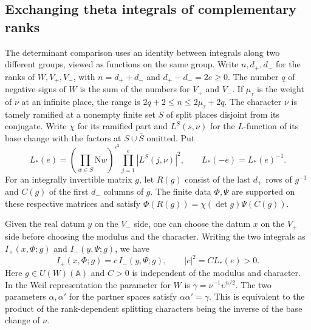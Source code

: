 \subsection{Exchanging theta integrals of complementary ranks}\label{sec:exchange-proof}

The determinant comparison uses an identity between integrals along two different
groups, viewed as functions on the same group. Write \(n,d_+,d_-\) for the ranks of
\(W,V_+,V_-\), with \(n=d_++d_-\) and \(d_+-d_-=2e\ge0\).
The number \(q\) of negative signs of \(W\) is the sum of the numbers for \(V_+\)
and \(V_-\). If \(\mu_\tau\) is the weight of \(\nu\) at an infinite place,
the range is \(2q+2\le n\le2\mu_\tau+2q\).
The character \(\nu\) is tamely ramified at a nonempty finite set \(S\) of split
places disjoint from its conjugate. Write \(\chi\) for its ramified part and
\(L^S(s,\nu)\) for the \(L\)-function of its base change with the factors
at \(S\cup\bar S\) omitted. Put
\begin{equation}\label{eq:exchange-lstar}
 L_*(e)=\left(\prod_{w\in S}\mathrm Nw\right)^{e^2}
             \prod_{j=1}^{e}|L^S(j,\nu)|^2,\qquad
 L_*(-e)=L_*(e)^{-1}.
\end{equation}
For an integrally invertible matrix \(g\), let \(R(g)\) consist of the last
\(d_+\) rows of \(g^{-1}\) and \(C(g)\) of the first \(d_-\) columns of \(g\).
The finite data \(\Phi,\Psi\) are supported on these respective matrices
and satisfy \(\Phi(R(g))=\chi(\det g)\Psi(C(g))\).

Given the real datum \(y\) on the \(V_-\) side, one can choose the datum \(x\)
on the \(V_+\) side before choosing the modulus and the character.
Writing the two integrals as \(I_+(x,\Phi;g)\) and \(I_-(y,\Psi;g)\), we have
\begin{equation}\label{eq:exchanged-integrals}
 I_+(x,\Phi;g)=c\,I_-(y,\Psi;g),\qquad
 |c|^2=C L_*(e)>0.
\end{equation}
Here \(g\in U(W)(\mathbb A)\) and \(C>0\) is independent of the modulus and character.
In the Weil representation the parameter for \(W\) is \(\gamma=\nu^{-1}\upsilon^{n/2}\).
The two parameters \(\alpha,\alpha'\) for the partner spaces satisfy
\(\alpha\alpha'=\gamma\). This is equivalent to the product of the
rank-dependent splitting characters being the inverse of the base change of \(\nu\).

